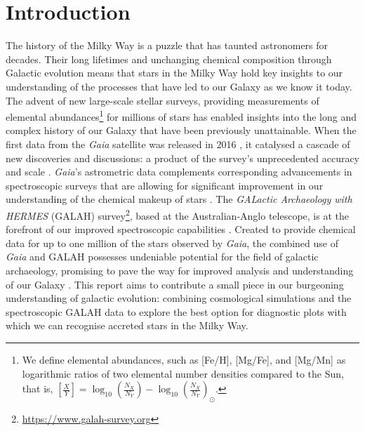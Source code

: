 \documentclass[fleqn,usenatbib]{mnras}
\newcommand{\Gaia}{\textit{Gaia}\xspace} %
\begin{document}


\section{Introduction}
\label{sec:intro}

The history of the Milky Way is a puzzle that has taunted astronomers for decades. Their long lifetimes and unchanging chemical composition through Galactic evolution means that stars in the Milky Way hold key insights to our understanding of the processes that have led to our Galaxy as we know it today. The advent of new large-scale stellar surveys, providing measurements of elemental abundances\footnote{We define elemental abundances, such as [Fe/H], [Mg/Fe], and [Mg/Mn] as logarithmic ratios of two elemental number densities compared to the Sun, that is, $\left[\frac{X}{Y}\right]=\log_{10}\left(\frac{N_X}{N_Y}\right) -\log_{10}\left(\frac{N_X}{N_Y}\right)_\odot$.} for millions of stars has enabled insights into the long and complex history of our Galaxy that have been previously unattainable. When the first data from the \Gaia satellite was released in 2016 \citep{Brown2016}, it catalysed a cascade of new discoveries and discussions: a product of the survey's unprecedented accuracy and scale \citep{BlandHawthorn2019}. \Gaia's astrometric data complements corresponding advancements in spectroscopic surveys that are allowing for significant improvement in our understanding of the chemical makeup of stars \citep{Buck2021}. The \textit{GALactic Archaeology with HERMES} (GALAH) survey\footnote{\url{https://www.galah-survey.org}}, based at the Australian-Anglo telescope, is at the forefront of our improved spectroscopic capabilities \citep{DeSilva2015}. Created to provide chemical data for up to one million of the stars observed by \Gaia, the combined use of \Gaia and GALAH possesses undeniable potential for the field of galactic archaeology, promising to pave the way for improved analysis and understanding of our Galaxy \citep{Buder2021}. This report aims to contribute a small piece in our burgeoning understanding of galactic evolution: combining cosmological simulations and the spectroscopic GALAH data to explore the best option for diagnostic plots with which we can recognise accreted stars in the Milky Way.  

\end{document}
